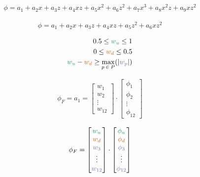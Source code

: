 \documentclass{article}
\begin{document}
\begin{align*}
\phi = a_1 + a_2 x + a_3 z + a_4 x z + a_5 x^2 + a_6 z^2 + a_7 x^3 + a_8 x^2 z + a_9 x z^2
\end{align*}

\begin{align*}
\phi = a_1 + a_2 x + a_3 z + a_4 x z + a_5 z^2 + a_6 x z^2
\end{align*}

\begin{align*}
	0.5 \leq \textcolor{u}{w_u} \leq 1 \\
	0 \leq \textcolor{d}{w_d} \leq 0.5 \\
	\textcolor{u}{w_u} - \textcolor{d}{w_d} \geq \max_{p\:\in\:P}(|\textcolor{p}{w_p}|)
\end{align*}

\begin{align*}
	\phi_F = a_1 = \begin{bmatrix}
		w_1 \\
		w_2 \\
		\vdots \\
		w_{12}
	\end{bmatrix}
	\cdot
	\begin{bmatrix}
		\phi_1 \\
		\phi_2 \\
		\vdots \\
		\phi_{12}
	\end{bmatrix}
\end{align*}

\begin{align*}
	\phi_F = \begin{bmatrix}
		\textcolor{u}{w_u} \\
		\textcolor{d}{w_d} \\
		\textcolor{p}{w_3} \\
		\vdots \\
		\textcolor{p}{w_{12}}
	\end{bmatrix}
	\cdot
	\begin{bmatrix}
		\textcolor{u}{\phi_u} \\
		\textcolor{d}{\phi_d} \\
		\textcolor{p}{\phi_3} \\
		\vdots \\
		\textcolor{p}{\phi_{12}}
	\end{bmatrix}
\end{align*}
\end{document}

